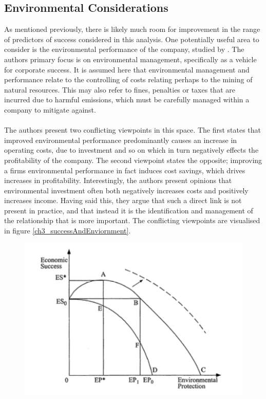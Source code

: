 \subsection{Environmental Considerations}\label{EnvironmentalConsiderations}
{As mentioned previously, there is likely much room for improvement in the range of predictors of success considered in this analysis. One potentially useful area to consider is the environmental performance of the company, studied by \cite{schaltegger2002link}. The authors primary focus is on environmental management, specifically as a vehicle for corporate success. It is assumed here that environmental management and performance relate to the controlling of costs relating perhaps to the mining of natural resources. This may also refer to fines, penalties or taxes that are incurred due to harmful emissions, which must be carefully managed within a company to mitigate against. \\\\
The authors present two conflicting viewpoints in this space. The first states that improved environmental performance predominantly causes an increase in operating costs, due to investment and so on which in turn negatively effects the profitability of the company. The second viewpoint states the opposite; improving a firms environmental performance in fact induces cost savings, which drives increases in profitability. Interestingly, the authors present opinions that environmental investment often both negatively increases costs and positively increases income. Having said this, they argue that such a direct link is not present in practice, and that instead it is the identification and management of the relationship that is more important. The conflicting viewpoints are visualised in figure \ref{ch3_successAndEnviornment}. 
\begin{figure}[h] 
\centering
\includegraphics[scale = 0.7]{images/ch3_successAndEnviornment.png}

\end{figure}}
